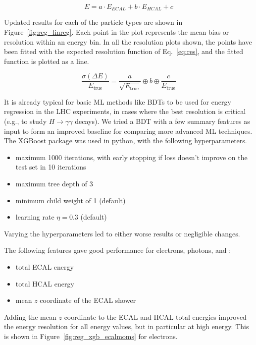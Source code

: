 \begin{equation}
E = a \cdot E_{ECAL} + b \cdot E_{HCAL} + c
\label{eq:linreg}
\end{equation}

Updated results for each of the particle types are shown in Figure~\ref{fig:reg_linreg}. Each point in the plot represents the mean bias or resolution within an energy bin. In all the resolution plots shown, the points have been fitted with the expected resolution function of Eq.~\ref{eq:res}, and the fitted function is plotted as a line.

\begin{equation}
\frac{\sigma(\Delta E)}{E_{\text{true}}} = \frac{a}{\sqrt{E_{\text{true}}}} \oplus b \oplus \frac{c}{E_{\text{true}}}
\label{eq:res}
\end{equation}

It is already typical for basic ML methods like BDTs to be used for energy regression in the LHC experiments, in cases where the best resolution is critical (e.g., to study $H \rightarrow \gamma\gamma$ decays).  We tried a BDT with a few summary features as input to form an improved baseline for comparing more advanced ML techniques.  The XGBoost package was used in python, with the following hyperparameters.  
\begin{itemize}
\item maximum 1000 iterations, with early stopping if loss doesn't improve on the test set in 10 iterations
\item maximum tree depth of 3
\item minimum child weight of 1 (default)
\item learning rate $\eta = 0.3$ (default)
\end{itemize}
Varying the hyperparameters led to either worse results or negligible changes.

The following features gave good performance for electrons, photons, and \pizero:
\begin{itemize}
\item total ECAL energy
\item total HCAL energy
\item mean $z$ coordinate of the ECAL shower
\end{itemize}

Adding the mean $z$ coordinate to the ECAL and HCAL total energies improved the energy resolution for all energy values, but in particular at high energy. This is shown in Figure~\ref{fig:reg_xgb_ecalmoms} for electrons.


